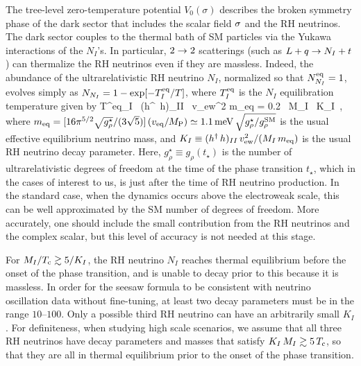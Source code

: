 \documentclass[a4paper,11pt]{article}
\begin{document}

The tree-level  zero-temperature potential $V_0(\sigma)$ describes the broken symmetry phase of the dark sector that includes
the scalar field $\sigma$ and the RH neutrinos. The dark sector couples to the thermal bath of SM particles via the Yukawa interactions
of the $N_I$'s. In particular, $2 \rightarrow 2$ scatterings (such as  $L+ q  \rightarrow N_I + t   $) can thermalize the RH neutrinos even if they are massless. 
Indeed, the abundance of the ultrarelativistic RH neutrino $N_I$, normalized so
that $N_{N_I}^{\rm eq} = 1$, evolves simply as $N_{N_I} = 1 - \exp[-T^{\rm eq}_{I}/T]$,
where $T^{\rm eq}_I$ is the $N_I$ equilibration temperature given by \cite{Garbrecht:2013bia,DiBari:2019zcc} 
\be\label{Teq}
T^{\rm eq}_I  \, {(h^\dagger \, h)_{II} \, v_{\rm ew}^2 \over m_{\rm eq}} = 0.2 \, M_I \, K_I\,  ,
\ee  
where $m_{\rm eq} = [16\pi^{5/2}\sqrt{g^\star_\rho}/(3\sqrt{5})]\,(v_{\rm eq}/M_{\rm P}) \simeq 1.1 \,{\rm meV}\,\sqrt{g^\star_\rho/g^{\rm SM}_\rho}$ 
is the usual effective equilibrium neutrino mass, and $K_I \equiv (h^\dagger \, h)_{II} \, v_{\rm ew}^2 /(M_I \, m_{\rm eq})$ is the usual RH neutrino decay parameter. Here, $g_{\rho}^\star \equiv g_{\rho}(t_{\star})$ is the number of ultrarelativistic degrees of freedom at the time   of the phase transition $t_\star$,  which in the cases of interest to us, is just after the time of RH neutrino production.
In the standard case, when the dynamics occurs above the electroweak scale, this can be well approximated by the SM number of degrees of
freedom. More accurately, one should include the small contribution from the RH neutrinos and the complex scalar, 
but this level of accuracy is not needed at this stage. 

For $M_I/T_{\rm c} \gtrsim 5/K_I$, the RH neutrino  $N_I$ reaches thermal equilibrium before the onset of the phase transition, and is unable to 
decay prior to this because it is massless.  In order for the seesaw formula to be consistent with neutrino oscillation data without fine-tuning, at least two 
decay parameters must be in the range $10$--$100$. Only a possible third RH neutrino can have an arbitrarily small $K_I$. 
For definiteness, when studying high scale scenarios, we assume that all three RH neutrinos have decay parameters and masses that satisfy $K_I \, M_I \gtrsim 5\,T_{\rm c}$, so 
that they are all in thermal equilibrium prior to the onset of the phase transition. 
 
\end{document}
